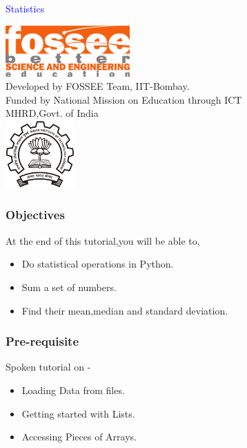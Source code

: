 \documentclass[presentation]{beamer}
\title{}
\author{FOSSEE}
\date{26 May 2011}
\begin{document}
\begin{frame}

\begin{center}
\vspace{12pt}
\textcolor{blue}{\huge Statistics}
\end{center}
\vspace{18pt}
\begin{center}
\vspace{10pt}
\includegraphics[scale=0.95]{../images/fossee-logo.png}\\
\vspace{5pt}
\scriptsize Developed by FOSSEE Team, IIT-Bombay. \\ 
\scriptsize Funded by National Mission on Education through ICT\\
\scriptsize  MHRD,Govt. of India\\
\includegraphics[scale=0.30]{../images/iitb-logo.png}\\
\end{center}
\end{frame}
\begin{frame}
\frametitle{Objectives}
\label{sec-2}

  At the end of this tutorial,you will be able to,
   

\begin{itemize}
\item Do statistical operations in Python.
\item Sum a set of numbers.
\item Find their mean,median and standard deviation.
\end{itemize}
\end{frame}
\begin{frame}
\frametitle{Pre-requisite}
\label{sec-3}

  Spoken tutorial on -

\begin{itemize}
\item Loading Data from files.
\item Getting started with Lists.
\item Accessing Pieces of Arrays.
\end{itemize}
\end{frame}
\end{document}
